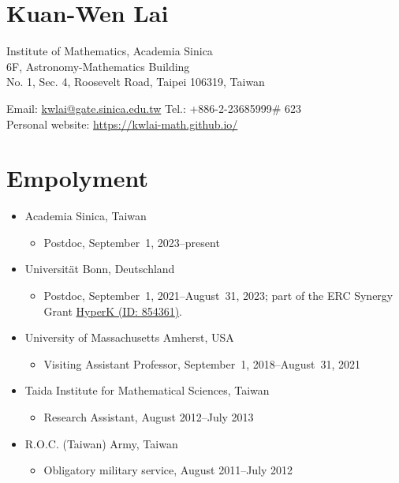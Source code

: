 \documentclass[12pt]{article}
\begin{document}
\thispagestyle{lastUpdated}
\section*{\Large Kuan-Wen Lai}
	Institute of Mathematics, Academia Sinica\\
	6F, Astronomy-Mathematics Building\\
	No. 1, Sec. 4, Roosevelt Road, Taipei 106319, Taiwan

	\medskip
	Email: \href{mailto:kwlai@gate.sinica.edu.tw}{kwlai@gate.sinica.edu.tw}\qquad
	Tel.: +886-2-23685999\# 623\\
	Personal website: \url{https://kwlai-math.github.io/}

\medskip


\section*{Empolyment}
\begin{itemize}[itemsep=0pt,parsep=0pt]
	\item[] Academia Sinica, Taiwan
	\begin{itemize}[itemsep=0pt]
		\item[] Postdoc, September~1, 2023--present
	\end{itemize}
	\item[] Universit\"at Bonn, Deutschland
	\begin{itemize}[itemsep=0pt]
		\item[] Postdoc, September~1, 2021--August~31, 2023; part of the ERC Synergy Grant \href{https://doi.org/10.3030/854361}{HyperK (ID: 854361)}.
	\end{itemize}
	\item[] University of Massachusetts Amherst, USA
	\begin{itemize}[itemsep=0pt]
		\item[] Visiting Assistant Professor, September~1, 2018--August~31, 2021
	\end{itemize}
	\item[] Taida Institute for Mathematical Sciences, Taiwan
	\begin{itemize}[itemsep=0pt]
		\item[] Research Assistant, August 2012--July 2013
	\end{itemize}
	\item[] R.O.C. (Taiwan) Army, Taiwan
	\begin{itemize}
		\item[] Obligatory military service, August 2011--July 2012
	\end{itemize}
\end{itemize}
\end{document}
